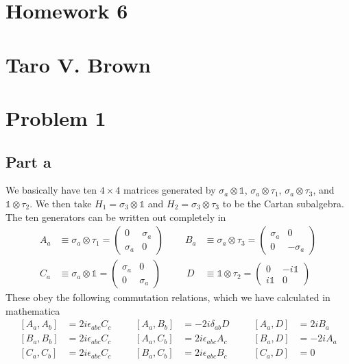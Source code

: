 \documentclass[a4paper,12pt]{article}
\begin{document}
\section*{Homework 6\\\\
	Taro V. Brown}\vspace*{1cm}
\section*{Problem 1}
\subsection*{Part a}
We basically have ten $4\times 4$ matrices generated by $\sigma_a \otimes \mathds{1}$, $\sigma_a \otimes \tau_1$, $\sigma_a \otimes \tau_3$, and $\mathds{1}\otimes \tau_2$. We then take $H_1=\sigma_3\otimes \mathds{1}$ and  $H_2=\sigma_3\otimes \tau_3$ to be the Cartan subalgebra. The ten generators can be written out completely in
\begin{equation}
	\begin{aligned}
		A_a&\equiv \sigma_a\otimes \tau_1=\begin{pmatrix}
			0 & \sigma_a\\
			\sigma_a & 0 
		\end{pmatrix}~~~~~~~~~~B_a& \equiv \sigma_a\otimes \tau_3=\begin{pmatrix}
		\sigma_a& 0\\
		0 & -\sigma_a 
	\end{pmatrix}\\
	C_a&\equiv \sigma_a\otimes\mathds{1}=\begin{pmatrix}
		\sigma_a& 0\\
		0 & \sigma_a 
	\end{pmatrix}~~~~~~~~~~~~D& \equiv \mathds{1}\otimes \tau_2=\begin{pmatrix}
	 0 & -i\mathds{1}\\
	i\mathds{1} & 0 
\end{pmatrix}
	\end{aligned}
\end{equation}
These obey the following commutation relations, which we have calculated in mathematica
\begin{equation}
	\begin{aligned}
		\left[A_a,A_b\right]&=2i\epsilon_{abc}C_c~~~~&&
		\left[A_a,B_b\right]&=-2i\delta_{ab}D~~~~&&
		\left[A_a,D\right]&=2iB_a\\
		\left[B_a,B_b\right]&=2i\epsilon_{abc}C_c~~~~&&
		\left[A_a,C_b\right]&=2i\epsilon_{abc}A_c~~~~&&
		\left[B_a,D\right]&=-2iA_a\\
		\left[C_a,C_b\right]&=2i\epsilon_{abc}C_c~~~~&&
		\left[B_a,C_b\right]&=2i\epsilon_{abc}B_c~~~~&&
		\left[C_a,D\right]&=0
	\end{aligned}
\end{equation}
\end{document}

